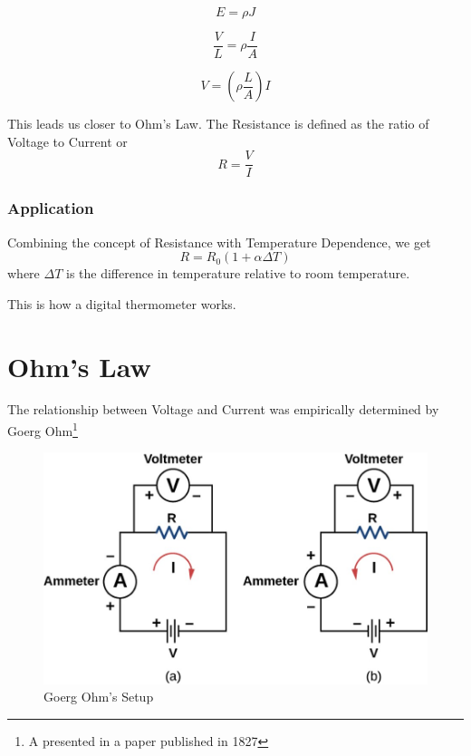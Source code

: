 \documentclass[14pt]{memoir}
\begin{document}
\begin{equation}
E = \rho J
\end{equation}

\begin{equation}
\frac{V}{L} = \rho \frac{I}{A}
\end{equation}

\begin{equation}
V = (\rho \frac{L}{A})I
\end{equation}


This leads us closer to Ohm's Law. The Resistance is defined as the ratio of Voltage to Current or
\begin{equation}
R = \frac{V}{I}
\end{equation}

\subsubsection{Application}
Combining the concept of Resistance with Temperature Dependence, we get
\begin{equation}
R = R_0 (1 + \alpha \Delta T)
\end{equation}
where $\Delta T$ is the difference in temperature relative to room temperature.

This is how a digital thermometer works. 

\section{Ohm's Law}
The relationship between Voltage and Current was empirically determined by Goerg Ohm\footnote{A presented in a paper published in 1827}

\begin{figure}[H]
\begin{center}
\includegraphics[scale=0.50]{fig/fig_09_19.jpg}
\caption{Goerg Ohm's Setup}
\label{fig:09_19}
\end{center}
\end{figure}
\end{document}
